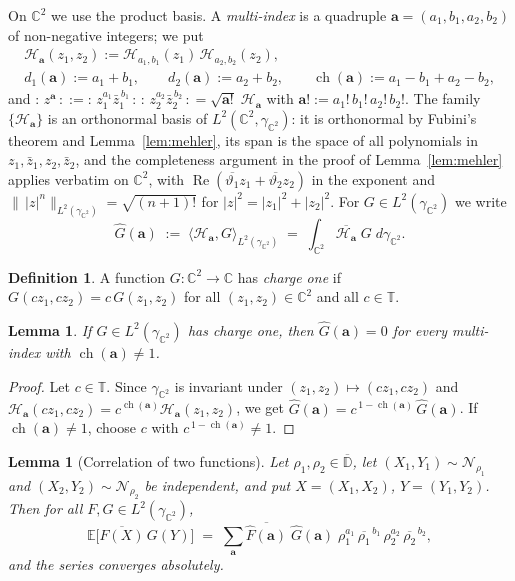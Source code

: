 \documentclass[11pt,reqno]{amsart}
\newtheorem{lemma}[theorem]{Lemma}
\theoremstyle{definition}
\newtheorem{definition}[theorem]{Definition}
\numberwithin{equation}{section}
\newcommand{\C}{\mathbb{C}}
\newcommand{\D}{\mathbb{D}}
\newcommand{\T}{\mathbb{T}}
\newcommand{\E}{\mathbb{E}}
\newcommand{\gCC}{\gamma_{\C^2}}
\newcommand{\wick}[1]{{:}\,#1\,{:}}
\DeclareMathOperator{\RePart}{Re}
\begin{document}
On $\C^2$ we use the product basis. A \emph{multi-index} is a quadruple $\mathbf{a}=(a_1,b_1,a_2,b_2)$ of non-negative integers; we put
\begin{gather*}
  \mathcal{H}_{\mathbf{a}}(z_1,z_2):=\mathcal{H}_{a_1,b_1}(z_1)\,\mathcal{H}_{a_2,b_2}(z_2),\\
  d_1(\mathbf{a}):=a_1+b_1,\qquad d_2(\mathbf{a}):=a_2+b_2,\qquad \operatorname{ch}(\mathbf{a}):=a_1-b_1+a_2-b_2 ,
\end{gather*}
and $\wick{z^{\mathbf{a}}}:=\wick{z_1^{a_1}\bar z_1^{\,b_1}}\,\wick{z_2^{a_2}\bar z_2^{\,b_2}}=\sqrt{\mathbf{a}!}\;\mathcal{H}_{\mathbf{a}}$ with $\mathbf{a}!:=a_1!\,b_1!\,a_2!\,b_2!$. The family $\{\mathcal{H}_{\mathbf{a}}\}$ is an orthonormal basis of $L^2(\C^2,\gCC)$: it is orthonormal by Fubini's theorem and Lemma~\ref{lem:mehler}, its span is the space of all polynomials in $z_1,\bar z_1,z_2,\bar z_2$, and the completeness argument in the proof of Lemma~\ref{lem:mehler} applies verbatim on $\C^2$, with $\RePart(\overline{\vartheta_1}z_1+\overline{\vartheta_2}z_2)$ in the exponent and $\|\,|z|^n\|_{L^2(\gCC)}=\sqrt{(n+1)!}$ for $|z|^2=|z_1|^2+|z_2|^2$. For $G\in L^2(\gCC)$ we write
\[
  \widehat{G}(\mathbf{a}) \;:=\; \langle \mathcal{H}_{\mathbf{a}},G\rangle_{L^2(\gCC)} \;=\; \int_{\C^2}\overline{\mathcal{H}_{\mathbf{a}}}\;G\;d\gCC .
\]

\begin{definition}\label{def:charge}
A function $G:\C^2\to\C$ has \emph{charge one} if $G(cz_1,cz_2)=c\,G(z_1,z_2)$ for all $(z_1,z_2)\in\C^2$ and all $c\in\T$.
\end{definition}

\begin{lemma}\label{lem:charge}
If $G\in L^2(\gCC)$ has charge one, then $\widehat{G}(\mathbf{a})=0$ for every multi-index with $\operatorname{ch}(\mathbf{a})\ne1$.
\end{lemma}

\begin{proof}
Let $c\in\T$. Since $\gCC$ is invariant under $(z_1,z_2)\mapsto(cz_1,cz_2)$ and $\mathcal{H}_{\mathbf{a}}(cz_1,cz_2)=c^{\operatorname{ch}(\mathbf{a})}\mathcal{H}_{\mathbf{a}}(z_1,z_2)$, we get $\widehat{G}(\mathbf{a})=c^{\,1-\operatorname{ch}(\mathbf{a})}\,\widehat{G}(\mathbf{a})$. If $\operatorname{ch}(\mathbf{a})\ne1$, choose $c$ with $c^{\,1-\operatorname{ch}(\mathbf{a})}\ne1$.
\end{proof}

\begin{lemma}[Correlation of two functions]\label{lem:mehler2}
Let $\rho_1,\rho_2\in\overline{\D}$, let $(X_1,Y_1)\sim\mathcal{N}_{\rho_1}$ and $(X_2,Y_2)\sim\mathcal{N}_{\rho_2}$ be independent, and put $X=(X_1,X_2)$, $Y=(Y_1,Y_2)$. Then for all $F,G\in L^2(\gCC)$,
\[
  \E\bigl[\overline{F(X)}\,G(Y)\bigr] \;=\; \sum_{\mathbf{a}}\overline{\widehat{F}(\mathbf{a})}\;\widehat{G}(\mathbf{a})\;\rho_1^{a_1}\,\overline{\rho_1}^{\,b_1}\,\rho_2^{a_2}\,\overline{\rho_2}^{\,b_2},
\]
and the series converges absolutely.
\end{lemma}
\end{document}

